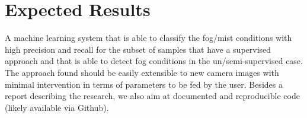 \documentclass[conference]{IEEEtran}
\begin{document}
\section{Expected Results}

A machine learning system that is able to classify the fog/mist conditions with high precision and recall
for the subset of samples that have a supervised approach and that is able to detect fog conditions in the un/semi-supervised case. The approach found should be easily extensible to new camera images with 
minimal intervention in terms of parameters to be fed by the user.
Besides a report describing the research, we also aim at documented and reproducible code (likely available via Github).  

\vspace{-0.2cm}







\end{document}
